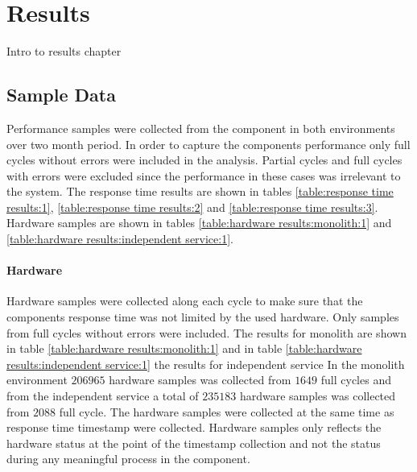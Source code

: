 \chapter{Results\label{results}}
Intro to results chapter

\section{Sample Data}
Performance samples were collected from the component in both environments over two month period.
In order to capture the components performance only full cycles without errors were included in the analysis.
Partial cycles and full cycles with errors were excluded since the performance in these cases was irrelevant to the system.
The response time results are shown in tables \ref{table:response time results:1}, \ref{table:response time results:2} and \ref{table:response time results:3}. Hardware samples are shown in tables \ref{table:hardware results:monolith:1} and \ref{table:hardware results:independent service:1}.

\subsubsection{Hardware}
Hardware samples were collected along each cycle to make sure that the components response time was not limited by the used hardware.
Only samples from full cycles without errors were included.
The results for monolith are shown in table \ref{table:hardware results:monolith:1} and in table \ref{table:hardware results:independent service:1} the results for independent service
In the monolith environment $206965$ hardware samples was collected from $1649$ full cycles and from the independent service a total of $235183$ hardware samples was collected from $2088$ full cycle.
The hardware samples were collected at the same time as response time timestamp were collected.
Hardware samples only reflects the hardware status at the point of the timestamp collection and not the status during any meaningful process in the component.

